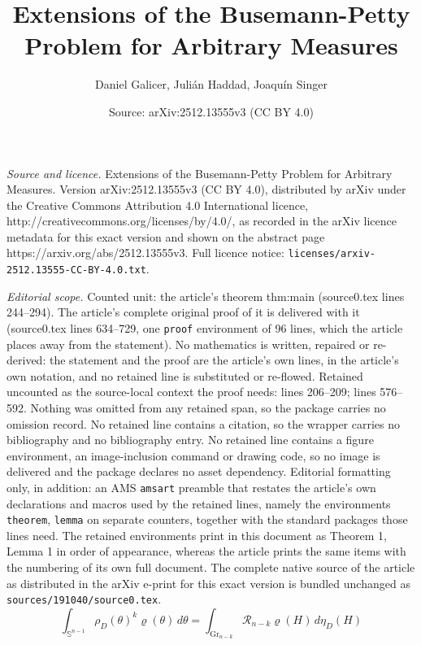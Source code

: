 \documentclass[10pt,a4paper]{amsart}
\title{Extensions of the Busemann-Petty Problem for Arbitrary Measures}
\author{Daniel Galicer, Juli\'an Haddad, Joaqu\'in Singer}
\date{Source: arXiv:2512.13555v3 (CC BY 4.0)}
\newcommand{\Gr}{\mathrm{Gr}}
\newcommand{\Sph}{\mathbb{S}}
\newcommand{\dd}{\,d}
\begin{document}
\maketitle

\noindent\emph{Source and licence.} Extensions of the Busemann-Petty Problem for Arbitrary Measures. Version arXiv:2512.13555v3 (CC BY 4.0), distributed by arXiv under the Creative Commons Attribution 4.0 International licence, http://creativecommons.org/licenses/by/4.0/, as recorded in the arXiv licence metadata for this exact version and shown on the abstract page https://arxiv.org/abs/2512.13555v3. Full licence notice: \texttt{licenses/arxiv-2512.13555-CC-BY-4.0.txt}.\par\smallskip

\noindent\textit{Editorial scope.} Counted unit: the article's theorem thm:main (source0.tex lines 244--294). The article's complete original proof of it is delivered with it (source0.tex lines 634--729, one \texttt{proof} environment of 96 lines, which the article places away from the statement). No mathematics is written, repaired or re-derived: the statement and the proof are the article's own lines, in the article's own notation, and no retained line is substituted or re-flowed.  Retained uncounted as the source-local context the proof needs: lines 206--209; lines 576--592.  Nothing was omitted from any retained span, so the package carries no omission record.  No retained line contains a citation, so the wrapper carries no bibliography and no bibliography entry.  No retained line contains a figure environment, an image-inclusion command or drawing code, so no image is delivered and the package declares no asset dependency.  Editorial formatting only, in addition: an AMS \texttt{amsart} preamble that restates the article's own declarations and macros used by the retained lines, namely the environments \texttt{theorem}, \texttt{lemma} on separate counters, together with the standard packages those lines need.  The retained environments print in this document as Theorem 1, Lemma 1 in order of appearance, whereas the article prints the same items with the numbering of its own full document.  The complete native source of the article as distributed in the arXiv e-print for this exact version is bundled unchanged as \texttt{sources/191040/source0.tex}.
\begin{equation}\label{eq:BP-definition}
 \int_{\Sph^{n-1}}\rho_D(\theta)^k \varrho(\theta)\dd\theta
 =\int_{\Gr_{n-k}}\mathcal R_{n-k}\varrho(H)\dd\eta_D(H)
\end{equation}
\end{document}
